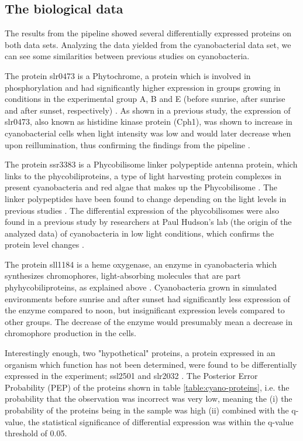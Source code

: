 \subsection{The biological data}
The results from the pipeline showed several differentially expressed proteins on both data sets. Analyzing the data yielded from the cyanobacterial data set, we can see some similarities between previous studies on cyanobacteria.

The protein slr0473 is a Phytochrome, a protein which is involved in phosphorylation and had significantly higher expression in groups growing in conditions in the experimental group A, B and E (before sunrise, after sunrise and after sunset, respectively) \cite{phytochrome}. As shown in a previous study, the expression of slr0473, also known as histidine kinase protein (Cph1), was shown to increase in cyanobacterial cells when light intensity was low and would later decrease when upon reillumination, thus confirming the findings from the pipeline \cite{phytochrome-dark}.

The protein ssr3383 is a Phycobilisome linker polypeptide antenna protein, which links to the phycobiliproteins, a type of light harvesting protein complexes in present cyanobacteria and red algae that makes up the Phycobilisome \cite{phycobilisomes}. The linker polypeptides have been found to change depending on the light levels in previous studies \cite{cyano-low-light}. The differential expression of the phycobilisomes were also found in a previous study by researchers at Paul Hudson's lab (the origin of the analyzed data) of cyanobacteria in low light conditions, which confirms the protein level changes \cite{michael-jahn-cyano}.

The protein sll1184 is a heme oxygenase, an enzyme in cyanobacteria which synthesizes chromophores, light-absorbing molecules that are part phyhycobiliproteins, as explained above \cite{heme-oxygenase} \cite{heme-oxygenase-2}. Cyanobacteria grown in simulated environments before sunrise and after sunset had significantly less expression of the enzyme compared to noon, but insignificant expression levels compared to other groups. The decrease of the enzyme would presumably mean a decrease in chromophore production in the cells.

Interestingly enough, two "hypothetical" proteins, a protein expressed in an organism which function has not been determined, were found to be differentially expressed in the experiment; ssl2501 and slr2032 \cite{hypothetical-protein1}. The Posterior Error Probability (PEP) of the proteins shown in table \ref{table:cyano-proteins}, i.e. the probability that the observation was incorrect was very low, meaning the (i) the probability of the proteins being in the sample was high (ii) combined with the q-value, the statistical significance of differential expression was within the q-value threshold of 0.05.


